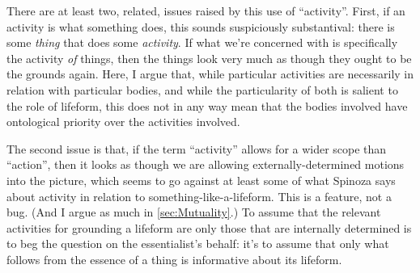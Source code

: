 \documentclass{article}
\begin{document}

There are at least two, related, issues raised by this use of \enquote{activity}. First, if an activity is what something does, this sounds suspiciously substantival: there is some \emph{thing} that does some \emph{activity}. If what we're concerned with is specifically the activity \emph{of} things, then the things look very much as though they ought to be the grounds again. Here, I argue that, while particular activities are necessarily in relation with particular bodies, and while the particularity of both is salient to the role of lifeform, this does not in any way mean that the bodies involved have ontological priority over the activities involved.

The second issue is that, if the term \enquote{activity} allows for a wider scope than \enquote{action}, then it looks as though we are allowing externally-determined motions into the picture, which seems to go against at least some of what Spinoza says about activity in relation to something-like-a-lifeform. This is a feature, not a bug. (And I argue as much in \cref{sec:Mutuality}.) To assume that the relevant activities for grounding a lifeform are only those that are internally determined is to beg the question on the essentialist's behalf: it's to assume that only what follows from the essence of a thing is informative about its lifeform.
\end{document}

